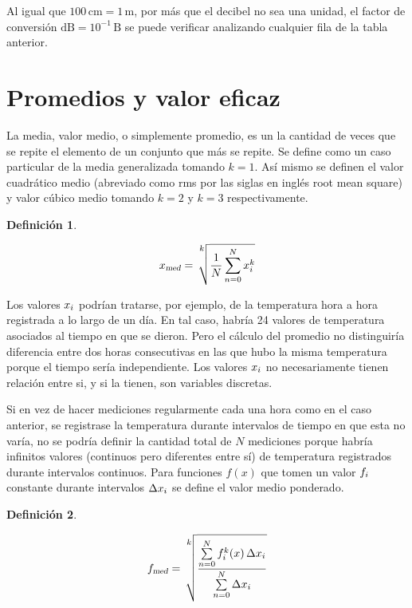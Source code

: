 \documentclass[a5paper,12pt,twoside]{book}
\newtheorem{defn}{{Definición}}[chapter]
\begin{document}
Al igual que $100\,\si{\centi\metre} = 1\,\si{\metre}$, por más que el decibel no sea una unidad, el factor de conversión $\si{\deci\bel} = 10^{-1} \,\si{\bel}$ se puede verificar analizando cualquier fila de la tabla anterior.


\section{Promedios y valor eficaz}

La media, valor medio, o simplemente promedio, es un la cantidad de veces que se repite el elemento de un conjunto que más se repite. Se define como un caso particular de la media generalizada tomando $k=1$. Así mismo se definen el valor cuadrático medio (abreviado como rms por las siglas en inglés root mean square) y valor cúbico medio tomando $k=2$ y $k=3$ respectivamente.

\begin{mdframed}[style=MyFrame1]
    \begin{defn}
    \end{defn}
    \begin{equation*}
        \sub{x}{med} = \sqrt[\uproot{20} \scriptstyle k]{ \frac{1}{N} \sum_{n=0}^{N} x_\ith^k }
    \end{equation*}
\end{mdframed}

Los valores $x_i$ podrían tratarse, por ejemplo, de la temperatura hora a hora registrada a lo largo de un día. En tal caso, habría 24 valores de temperatura asociados al tiempo en que se dieron. Pero el cálculo del promedio no distinguiría diferencia entre dos horas consecutivas en las que hubo la misma temperatura porque el tiempo sería independiente. Los valores $x_i$ no necesariamente tienen relación entre si, y si la tienen, son variables discretas.

Si en vez de hacer mediciones regularmente cada una hora como en el caso anterior, se registrase la temperatura durante intervalos de tiempo en que esta no varía, no se podría definir la cantidad total de $N$ mediciones porque habría infinitos valores (continuos pero diferentes entre sí) de temperatura registrados durante intervalos continuos. Para funciones $f(x)$ que tomen un valor $f_i$ constante durante intervalos $\Delta x_i$ se define el valor medio ponderado.

\begin{mdframed}[style=MyFrame1]
    \begin{defn}
    \end{defn}
    \begin{equation*}
        \sub{f}{med} = \sqrt[\uproot{36} \scriptstyle k]{ \frac{\sum\limits_{n=0}^{N} f_\ith^k(x) \, \Delta x_\ith}{\sum\limits_{n=0}^{N} \Delta x_\ith }}
    \end{equation*}
\end{mdframed}
\end{document}
